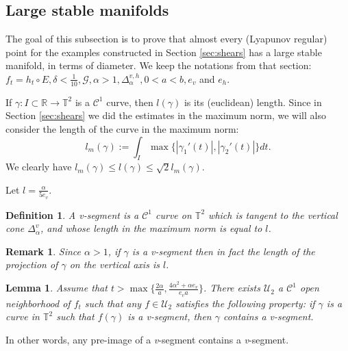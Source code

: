 \documentclass[11pt,letterpaper,reqno]{article}
\newtheorem{lemma}{Lemma}[section]
\newtheorem{definition}{Definition}[section]
\newtheorem{remark}{Remark}[section]
\newcommand{\TT}{\mathbb{T}^2}
\newcommand{\Dev}{\Delta_{\alpha}^v}
\begin{document}
\subsection{Large stable manifolds}\label{sub:Large}



The goal of this subsection is to prove that almost every (Lyapunov regular) point for the examples constructed in Section \ref{sec:shears} has a large stable manifold, in terms of diameter. We keep the notations from that section: $f_t=h_t\circ E, \delta<\frac 1{10}, \mathcal G, \alpha>1, \Delta_{\alpha}^{v,h}, 0<a<b, e_v$ and $e_h$.

If $\gamma:I\subset\mathbb R\rightarrow\TT$ is a $\mathcal C^1$ curve, then $l(\gamma)$ is its (euclidean) length. Since in Section \ref{sec:shears} we did the estimates in the maximum norm, we will also consider the length of the curve in the maximum norm:
$$
l_m(\gamma):=\int_I\max\{|\gamma_1'(t)|,|\gamma_2'(t)|\}dt.
$$
We clearly have $l_m(\gamma)\leq l(\gamma)\leq \sqrt 2l_m(\gamma)$.

Let $l=\frac {\alpha}{5e_v}$.

\begin{definition}
A \textit{v}-segment is a $\mathcal C^1$ curve on $\TT$ which is tangent to the vertical cone $\Dev$, and whose length in the maximum norm is equal to $l$.
\end{definition}

\begin{remark}
Since $\alpha>1$, if $\gamma$ is a \textit{v}-segment then in fact the length of the projection of $\gamma$ on the vertical axis is $l$.
\end{remark}

\begin{lemma}
Assume that $t>\max\{\frac{2\alpha}a,\frac{4\alpha^2+\alpha e_v}{e_va}\}$. There exists $\mathcal U_2$ a $\mathcal C^1$ open neighborhood of $f_t$ such that any $f\in \mathcal U_2$ satisfies the following property: if $\gamma$ is a curve in $\TT$ such that $f(\gamma)$ is a \textit{v}-segment, then $\gamma$ contains a \textit{v}-segment.
\end{lemma}

In other words, any pre-image of a \textit{v}-segment contains a \textit{v}-segment.
\end{document}
